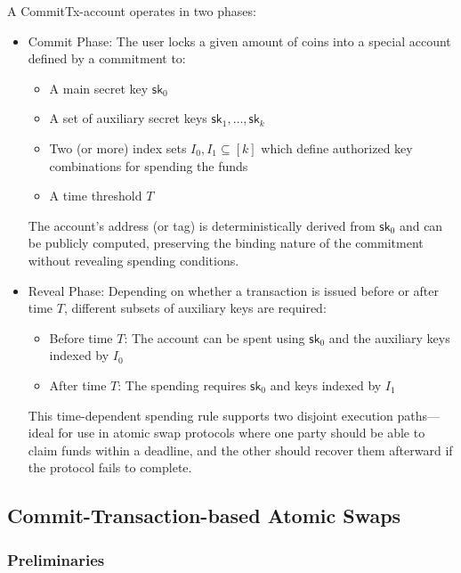A CommitTx-account operates in two phases:
\begin{itemize}
	\item Commit Phase: The user locks a given amount of coins into a special account defined by a commitment to:
	\begin{itemize}
		\item A main secret key $\mathsf{sk}_0$

		\item A set of auxiliary secret keys $\mathsf{sk}_1, \dots, \mathsf{sk}_k$

		\item Two (or more) index sets $I_0, I_1 \subseteq [k]$ which define authorized key combinations for spending the funds

		\item A time threshold $T$
	\end{itemize}

The account's address (or tag) is deterministically derived from $\mathsf{sk}_0$ and can be publicly computed, preserving the binding nature of the commitment without revealing spending conditions.

\item Reveal Phase: Depending on whether a transaction is issued before or after time $T$, different subsets of auxiliary keys are required:

	\begin{itemize}
		\item Before time $T$: The account can be spent using $\mathsf{sk}_0$ and the auxiliary keys indexed by $I_0$

		\item After time $T$: The spending requires $\mathsf{sk}_0$ and keys indexed by $I_1$

	\end{itemize}
This time-dependent spending rule supports two disjoint execution paths—ideal for use in atomic swap protocols where one party should be able to claim funds within a deadline, and the other should recover them afterward if the protocol fails to complete.
\end{itemize}


\subsection{Commit-Transaction-based Atomic Swaps}
\subsubsection{Preliminaries}

